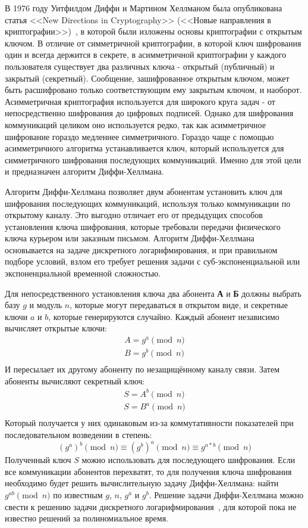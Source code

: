 \documentclass[times,specification,annotation]{itmo-student-thesis}
\begin{document}
В 1976 году Уитфилдом Диффи и Мартином Хеллманом была опубликована статья <<New Directions in Cryptography>>
(<<Новые направления в криптографии>>)~\cite{dif77}, в которой были изложены основы криптографии с открытым ключом.
В отличие от симметричной криптографии, в которой ключ шифрования один и всегда держится в секрете,
в асимметричной криптографии у каждого пользователя существует два различных ключа - открытый (публичный) и закрытый (секретный).
Сообщение, зашифрованное открытым ключом, может быть расшифровано только соответствующим ему закрытым ключом, и наоборот.
Асимметричная криптография используется для широкого круга задач - от непосредственно шифрования до цифровых подписей.
Однако для шифрования коммуникаций целиком оно используется редко, так как асимметричное шифрование гораздо
медленнее симметричного.
Гораздо чаще с помощью асимметричного алгоритма устанавливается ключ, который используется для симметричного шифрования
последующих коммуникаций.
Именно для этой цели и предназначен алгоритм Диффи-Хеллмана.\par
Алгоритм Диффи-Хеллмана позволяет двум абонентам установить ключ для шифрования последующих коммуникаций,
используя только коммуникации по открытому каналу.
Это выгодно отличает его от предыдущих способов установления ключа шифрования, которые требовали передачи
физического ключа курьером или заказным письмом.
Алгоритм Диффи-Хеллмана основывается на задаче дискретного логарифмирования, и при правильном подборе условий,
взлом его требует решения задачи с суб-экспоненциальной или экспоненциальной временной сложностью.\par
Для непосредственного установления ключа два абонента \textbf{А} и \textbf{Б} должны выбрать базу $g$ и модуль $n$, которые
могут передаваться в открытом виде, и секретные ключи $a$ и $b$, которые генерируются случайно.
Каждый абонент независимо вычисляет открытые ключи:
\begin{gather*}
    A = g^a\pmod{n}\\
    B = g^b\pmod{n}\\
\end{gather*}
И пересылает их другому абоненту по незащищённому каналу связи.
Затем абоненты вычисляют секретный ключ:
\begin{gather*}
    S = A^b\pmod{n}\\
    S = B^a\pmod{n}\\
\end{gather*}
Который получается у них одинаковым из-за коммутативности показателей при последовательном возведении в степень:
\[(g^a)^b \pmod{n} \equiv (g^b)^a \pmod{n} \equiv g^{a*b}\pmod{n}\]
Полученный ключ $S$ можно использовать для последующего шифрования.
Если все коммуникации абонентов перехватят, то для получения ключа шифрования необходимо будет решить
вычислительную задачу Диффи-Хеллмана: найти $g^{ab}\pmod{n}$ по известным $g$, $n$, $g^a$ и $g^b$.
Решение задачи Диффи-Хеллмана можно свести к решению задачи дискретного логарифмирования~\cite{sma15},
для которой пока не известно решений за полиномиальное время.
\end{document}
